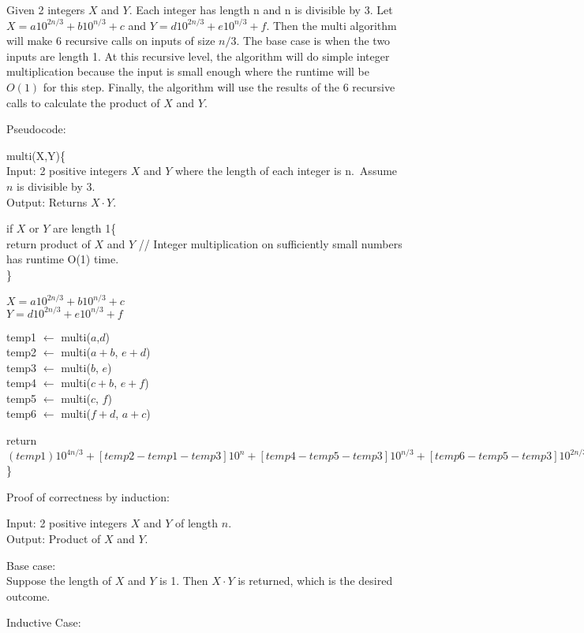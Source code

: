 \documentclass[11pt]{article}
\begin{document}
    Given 2 integers \(X\) and \(Y\). Each integer has length n and n is
divisible by 3. Let \(X = a10^{2n/3} + b10^{n/3} + c\) and
\(Y = d10^{2n/3} + e10^{n/3} + f\). Then the multi algorithm will make 6
recursive calls on inputs of size \(n/3\). The base case is when the two
inputs are length 1. At this recursive level, the algorithm will do
simple integer multiplication because the input is small enough where
the runtime will be \(O(1)\) for this step. Finally, the algorithm will
use the results of the 6 recursive calls to calculate the product of
\(X\) and \(Y\).

Pseudocode:

multi(X,Y)\{\\
Input: 2 positive integers \(X\) and \(Y\) where the length of each
integer is n.~Assume \(n\) is divisible by 3.\\
Output: Returns \(X \cdot Y\).

if \(X\) or \(Y\) are length 1\{\\
return product of \(X\) and \(Y\) // Integer multiplication on
sufficiently small numbers has runtime O(1) time.\\
\}

\(X = a10^{2n/3} + b10^{n/3} + c\)\\
\(Y = d10^{2n/3} + e10^{n/3} + f\)

temp1 \(\leftarrow\) multi(\(a\),\(d\))\\
temp2 \(\leftarrow\) multi(\(a+b\), \(e+d\))\\
temp3 \(\leftarrow\) multi(\(b\), \(e\))\\
temp4 \(\leftarrow\) multi(\(c+b\), \(e+f\))\\
temp5 \(\leftarrow\) multi(\(c\), \(f\))\\
temp6 \(\leftarrow\) multi(\(f+d\), \(a+c\))

return
\((temp1)10^{4n/3} + [temp2 - temp1 - temp3]10^{n} + [temp4 - temp5 - temp3]10^{n/3} + [temp6 - temp5 - temp3]10^{2n/3} + (temp5)\)
\}

    Proof of correctness by induction:

Input: 2 positive integers \(X\) and \(Y\) of length \(n\).\\
Output: Product of \(X\) and \(Y\).

Base case:\\
Suppose the length of \(X\) and \(Y\) is 1. Then \(X \cdot Y\) is
returned, which is the desired outcome.

Inductive Case:
\end{document}
